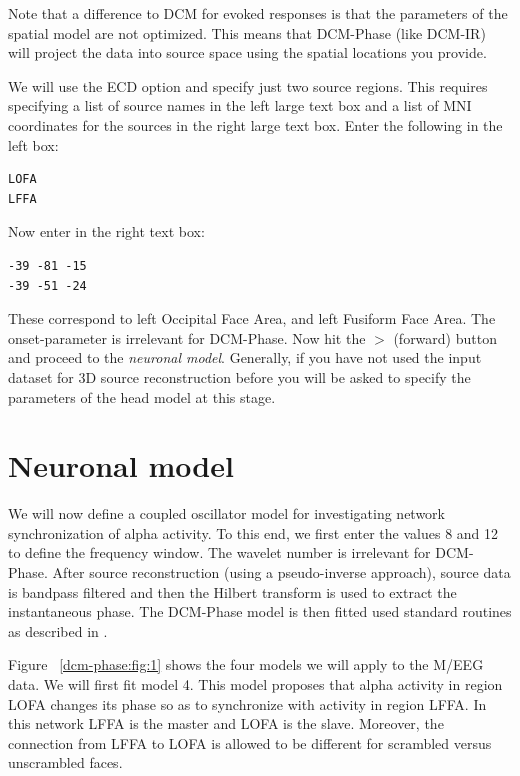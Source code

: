 Note that a difference to DCM for evoked responses is that the parameters of the spatial model are not optimized. This means that DCM-Phase (like DCM-IR) will project the data into source space using the spatial locations you provide.

We will use the ECD option and specify just two source regions. This requires specifying a list of source names in the left large text box and a list of MNI coordinates for the sources in the right large text box. Enter the following in the left box:

\begin{verbatim}
LOFA
LFFA
\end{verbatim}

Now enter in the right text box:

\begin{verbatim}
-39 -81 -15
-39 -51 -24
\end{verbatim}

These correspond to left Occipital Face Area, and left Fusiform Face Area.
The onset-parameter is irrelevant for DCM-Phase. Now hit the $>$ (forward) button and proceed to the \textit{neuronal model}. Generally, if you have not used the input dataset for 3D source reconstruction before you will be asked to specify the parameters of the head model at this stage.

\section{Neuronal model}

We will now define a coupled oscillator model for investigating network synchronization of alpha activity. To this end, we first enter the values 8 and 12 to define the frequency window. The wavelet number is irrelevant for DCM-Phase. After source reconstruction (using a pseudo-inverse approach), source data is bandpass filtered and then the Hilbert transform is used to extract the instantaneous phase. The DCM-Phase model is then fitted used standard routines as described in \cite{dcm_phase}.

Figure ~\ref{dcm-phase:fig:1} shows the four models we will apply to the 
M/EEG data. We will first fit model 4. This model proposes that alpha activity in region LOFA changes its phase so as to synchronize with activity in region LFFA. In this network LFFA is the master and LOFA is the slave. Moreover, the 
connection from LFFA to LOFA is allowed to be different for scrambled versus unscrambled faces.

